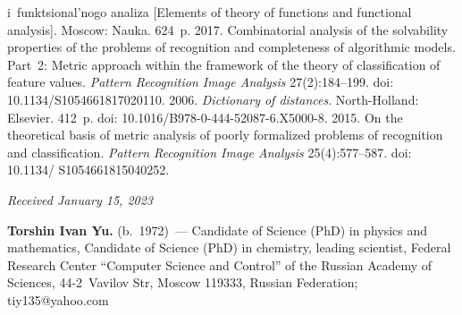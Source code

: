 \begin{multicols}{2}
{{\begin{thebibliography}{9}
{i~funktsional'nogo analiza} [Elements of theory of functions and functional 
analysis]. Moscow: Nauka. 624~p.
 2017. Combinatorial analysis of the 
solvability properties of the problems of recognition and completeness of algorithmic 
models. Part~2: Metric approach within the framework of the theory of classification 
of feature values. \textit{Pattern Recognition Image Analysis} 27(2):184--199. doi: 
10.1134/S1054661817020110.
 2006. \textit{Dictionary of distances}.  
North-Holland: Elsevier. 412~p. doi: 10.1016/B978-0-444-52087-6.X5000-8.
 2015. On the theoretical basis of metric 
analysis of poorly formalized problems of recognition and classification. \textit{Pattern 
Recognition Image Analysis} 25(4):577--587. doi: 10.1134/ S1054661815040252.
\end{thebibliography}

 }
 }

\end{multicols}

\vspace*{-6pt}

\hfill{\small\textit{Received January 15, 2023}} 

     
     \Contrl
     

\noindent
\textbf{Torshin Ivan Yu.} (b.\ 1972)~--- Candidate of Science (PhD) in physics and 
mathematics, Candidate of Science (PhD) in chemistry, leading scientist, Federal 
Research Center ``Computer Science and Control'' of the Russian Academy of 
Sciences, 44-2~Vavilov Str, Moscow 119333, Russian Federation; 
\mbox{tiy135@yahoo.com}

\label{end\stat}

\renewcommand{\bibname}{\protect\rm Литература} 